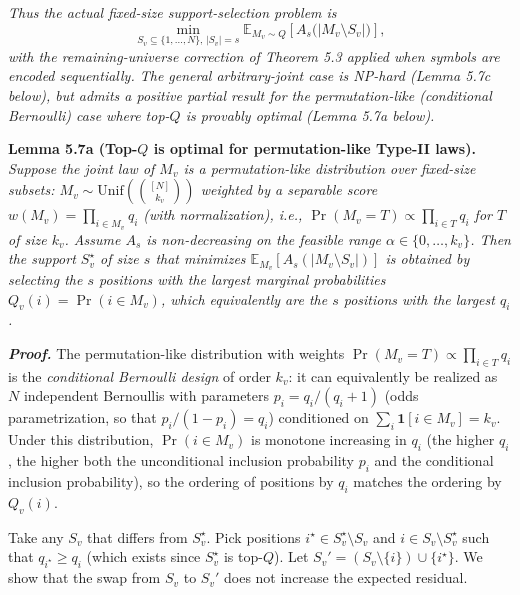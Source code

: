 \documentclass[
]{article}
\begin{document}
\emph{Thus the actual fixed-size support-selection problem is}
\[
\min_{S_v \subseteq \{1, \ldots, N\},\, |S_v| = s}
\mathbb{E}_{M_v \sim Q}
\left[
A_s\bigl(|M_v \setminus S_v|\bigr)
\right],
\]
\emph{with the remaining-universe correction of Theorem 5.3 applied
when symbols are encoded sequentially. The general arbitrary-joint
case is NP-hard (Lemma 5.7c below), but admits a positive partial
result for the permutation-like (conditional Bernoulli) case where
top-$Q$ is provably optimal (Lemma 5.7a below).}

\textbf{Lemma 5.7a (Top-$Q$ is optimal for permutation-like Type-II
laws).} \emph{Suppose the joint law of $M_v$ is a
\emph{permutation-like} distribution over fixed-size subsets:
$M_v \sim \mathrm{Unif}(\binom{[N]}{k_v})$ weighted by a separable
score $w(M_v) = \prod_{i \in M_v} q_i$ (with normalization), i.e.,
$\Pr(M_v = T) \propto \prod_{i \in T} q_i$ for $T$ of size $k_v$.
Assume $A_s$ is non-decreasing on the feasible range
$\alpha \in \{0, \dots, k_v\}$. Then the support $S_v^\star$ of size
$s$ that minimizes
$\mathbb{E}_{M_v}[A_s(|M_v \setminus S_v|)]$ is obtained by selecting
the $s$ positions with the largest marginal probabilities
$Q_v(i) = \Pr(i \in M_v)$, which equivalently are the $s$ positions
with the largest $q_i$.}

\emph{\textbf{Proof.}} The permutation-like distribution with weights
$\Pr(M_v = T) \propto \prod_{i \in T} q_i$ is the \emph{conditional
Bernoulli design} of order $k_v$: it can equivalently be realized as
$N$ independent Bernoullis with parameters $p_i = q_i / (q_i + 1)$
(odds parametrization, so that $p_i / (1 - p_i) = q_i$) conditioned
on $\sum_i \mathbf{1}[i \in M_v] = k_v$. Under this distribution,
$\Pr(i \in M_v)$ is monotone increasing in $q_i$ (the higher $q_i$,
the higher both the unconditional inclusion probability $p_i$ and
the conditional inclusion probability), so the ordering of
positions by $q_i$ matches the ordering by $Q_v(i)$.

Take any $S_v$ that differs from $S_v^\star$. Pick positions
$i^\star \in S_v^\star \setminus S_v$ and $i \in S_v \setminus
S_v^\star$ such that $q_{i^\star} \geq q_i$ (which exists since
$S_v^\star$ is top-$Q$). Let $S_v' = (S_v \setminus \{i\}) \cup
\{i^\star\}$. We show that the swap from $S_v$ to $S_v'$ does not
increase the expected residual.
\end{document}
